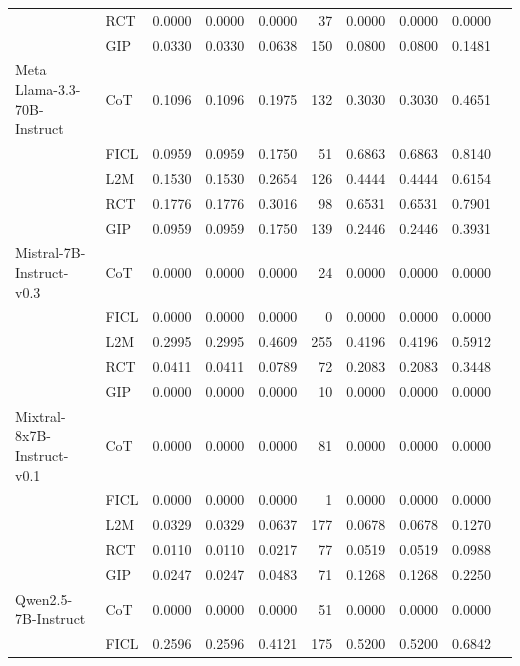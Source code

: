 \documentclass[conference]{IEEEtran}
\begin{document}
\begin{longtable}{p{3.5cm} l r r r r r r r r}
                            & RCT  & 0.0000 & 0.0000 & 0.0000 & 37  & 0.0000 & 0.0000 & 0.0000 \\
                            & GIP  & 0.0330 & 0.0330 & 0.0638 & 150 & 0.0800 & 0.0800 & 0.1481 \\
Meta Llama-3.3-70B-Instruct & CoT  & 0.1096 & 0.1096 & 0.1975 & 132 & 0.3030 & 0.3030 & 0.4651 \\
                            & FICL & 0.0959 & 0.0959 & 0.1750 & 51  & 0.6863 & 0.6863 & 0.8140 \\
                            & L2M  & 0.1530 & 0.1530 & 0.2654 & 126 & 0.4444 & 0.4444 & 0.6154 \\
                            & RCT  & 0.1776 & 0.1776 & 0.3016 & 98  & 0.6531 & 0.6531 & 0.7901 \\
                            & GIP  & 0.0959 & 0.0959 & 0.1750 & 139 & 0.2446 & 0.2446 & 0.3931 \\
Mistral-7B-Instruct-v0.3    & CoT  & 0.0000 & 0.0000 & 0.0000 & 24  & 0.0000 & 0.0000 & 0.0000 \\
                            & FICL & 0.0000 & 0.0000 & 0.0000 & 0   & 0.0000 & 0.0000 & 0.0000 \\
                            & L2M  & 0.2995 & 0.2995 & 0.4609 & 255 & 0.4196 & 0.4196 & 0.5912 \\
                            & RCT  & 0.0411 & 0.0411 & 0.0789 & 72  & 0.2083 & 0.2083 & 0.3448 \\
                            & GIP  & 0.0000 & 0.0000 & 0.0000 & 10  & 0.0000 & 0.0000 & 0.0000 \\
Mixtral-8x7B-Instruct-v0.1  & CoT  & 0.0000 & 0.0000 & 0.0000 & 81  & 0.0000 & 0.0000 & 0.0000 \\
                            & FICL & 0.0000 & 0.0000 & 0.0000 & 1   & 0.0000 & 0.0000 & 0.0000 \\
                            & L2M  & 0.0329 & 0.0329 & 0.0637 & 177 & 0.0678 & 0.0678 & 0.1270 \\
                            & RCT  & 0.0110 & 0.0110 & 0.0217 & 77  & 0.0519 & 0.0519 & 0.0988 \\
                            & GIP  & 0.0247 & 0.0247 & 0.0483 & 71  & 0.1268 & 0.1268 & 0.2250 \\
Qwen2.5-7B-Instruct         & CoT  & 0.0000 & 0.0000 & 0.0000 & 51  & 0.0000 & 0.0000 & 0.0000 \\
                            & FICL & 0.2596 & 0.2596 & 0.4121 & 175 & 0.5200 & 0.5200 & 0.6842 \\

\end{longtable}
\end{document}
